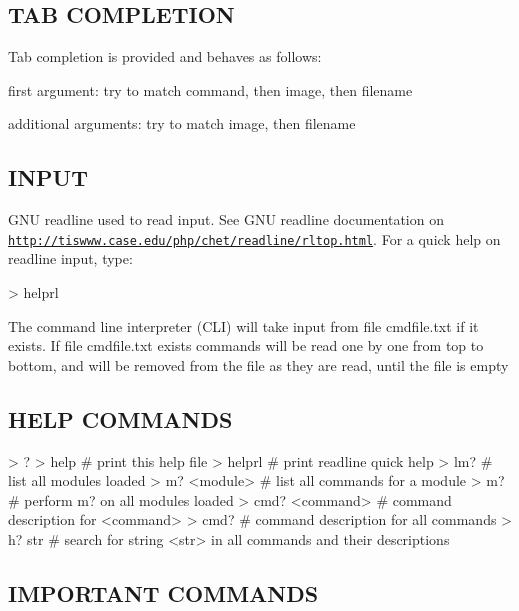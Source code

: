 \subsection*{T\+A\+B C\+O\+M\+P\+L\+E\+T\+I\+O\+N}

Tab completion is provided and behaves as follows\+:
\begin{DoxyItemize}
\item first argument\+: try to match command, then image, then filename
\item additional arguments\+: try to match image, then filename
\end{DoxyItemize}

\subsection*{I\+N\+P\+U\+T}

G\+N\+U readline used to read input. See G\+N\+U readline documentation on \href{http://tiswww.case.edu/php/chet/readline/rltop.html}{\tt http\+://tiswww.\+case.\+edu/php/chet/readline/rltop.\+html}. For a quick help on readline input, type\+: \begin{DoxyVerb}> helprl 
\end{DoxyVerb}


The command line interpreter (C\+L\+I) will take input from file cmdfile.\+txt if it exists. If file cmdfile.\+txt exists commands will be read one by one from top to bottom, and will be removed from the file as they are read, until the file is empty

\subsection*{H\+E\+L\+P C\+O\+M\+M\+A\+N\+D\+S}

\begin{DoxyVerb}> ?
> help               
    # print this help file
> helprl             
    # print readline quick help
> lm?                        
    # list all modules loaded
> m? <module>               
    # list all commands for a module
> m?                    
    # perform m? on all modules loaded
> cmd? <command>              
    # command description for <command>
> cmd?                    
    # command description for all commands
> h? str                    
    # search for string <str> in all commands and their descriptions
\end{DoxyVerb}


\subsection*{I\+M\+P\+O\+R\+T\+A\+N\+T C\+O\+M\+M\+A\+N\+D\+S}

